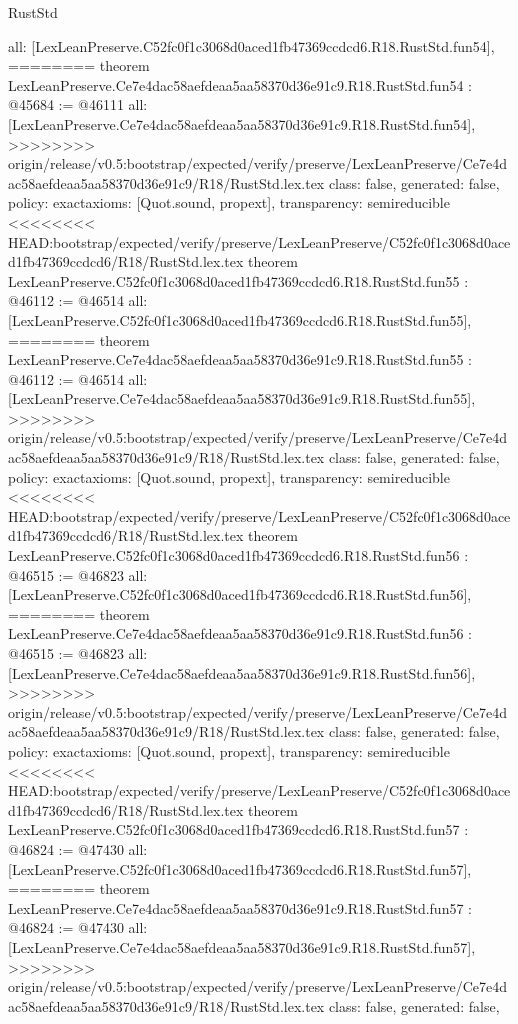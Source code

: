 \begin{lexlean}{RustStd}
\begin{coremodule}
{\begin{coremodule}
{{{{{{{{{{{{{{{{{{{{{{{{{{{{{{{{{{{{{{{{{{{{{{{{{{{{{{{{{  all: [LexLeanPreserve.C52fc0f1c3068d0aced1fb47369ccdcd6.R18.RustStd.fun54],
========
theorem LexLeanPreserve.Ce7e4dac58aefdeaa5aa58370d36e91c9.R18.RustStd.fun54 : @45684 := @46111 {
  all: [LexLeanPreserve.Ce7e4dac58aefdeaa5aa58370d36e91c9.R18.RustStd.fun54],
>>>>>>>> origin/release/v0.5:bootstrap/expected/verify/preserve/LexLeanPreserve/Ce7e4dac58aefdeaa5aa58370d36e91c9/R18/RustStd.lex.tex
  class: false,
  generated: false,
  policy: exact{axioms: [Quot.sound, propext]},
  transparency: semireducible
}
<<<<<<<< HEAD:bootstrap/expected/verify/preserve/LexLeanPreserve/C52fc0f1c3068d0aced1fb47369ccdcd6/R18/RustStd.lex.tex
theorem LexLeanPreserve.C52fc0f1c3068d0aced1fb47369ccdcd6.R18.RustStd.fun55 : @46112 := @46514 {
  all: [LexLeanPreserve.C52fc0f1c3068d0aced1fb47369ccdcd6.R18.RustStd.fun55],
========
theorem LexLeanPreserve.Ce7e4dac58aefdeaa5aa58370d36e91c9.R18.RustStd.fun55 : @46112 := @46514 {
  all: [LexLeanPreserve.Ce7e4dac58aefdeaa5aa58370d36e91c9.R18.RustStd.fun55],
>>>>>>>> origin/release/v0.5:bootstrap/expected/verify/preserve/LexLeanPreserve/Ce7e4dac58aefdeaa5aa58370d36e91c9/R18/RustStd.lex.tex
  class: false,
  generated: false,
  policy: exact{axioms: [Quot.sound, propext]},
  transparency: semireducible
}
<<<<<<<< HEAD:bootstrap/expected/verify/preserve/LexLeanPreserve/C52fc0f1c3068d0aced1fb47369ccdcd6/R18/RustStd.lex.tex
theorem LexLeanPreserve.C52fc0f1c3068d0aced1fb47369ccdcd6.R18.RustStd.fun56 : @46515 := @46823 {
  all: [LexLeanPreserve.C52fc0f1c3068d0aced1fb47369ccdcd6.R18.RustStd.fun56],
========
theorem LexLeanPreserve.Ce7e4dac58aefdeaa5aa58370d36e91c9.R18.RustStd.fun56 : @46515 := @46823 {
  all: [LexLeanPreserve.Ce7e4dac58aefdeaa5aa58370d36e91c9.R18.RustStd.fun56],
>>>>>>>> origin/release/v0.5:bootstrap/expected/verify/preserve/LexLeanPreserve/Ce7e4dac58aefdeaa5aa58370d36e91c9/R18/RustStd.lex.tex
  class: false,
  generated: false,
  policy: exact{axioms: [Quot.sound, propext]},
  transparency: semireducible
}
<<<<<<<< HEAD:bootstrap/expected/verify/preserve/LexLeanPreserve/C52fc0f1c3068d0aced1fb47369ccdcd6/R18/RustStd.lex.tex
theorem LexLeanPreserve.C52fc0f1c3068d0aced1fb47369ccdcd6.R18.RustStd.fun57 : @46824 := @47430 {
  all: [LexLeanPreserve.C52fc0f1c3068d0aced1fb47369ccdcd6.R18.RustStd.fun57],
========
theorem LexLeanPreserve.Ce7e4dac58aefdeaa5aa58370d36e91c9.R18.RustStd.fun57 : @46824 := @47430 {
  all: [LexLeanPreserve.Ce7e4dac58aefdeaa5aa58370d36e91c9.R18.RustStd.fun57],
>>>>>>>> origin/release/v0.5:bootstrap/expected/verify/preserve/LexLeanPreserve/Ce7e4dac58aefdeaa5aa58370d36e91c9/R18/RustStd.lex.tex
  class: false,
  generated: false,
}}}}}}}}}}}}}}}}}}}}}}}}}}}}}}}}}}}}}}}}}}}}}}}}}}}}}}}}}}}}}
\end{coremodule}}
\end{coremodule}
\end{lexlean}
